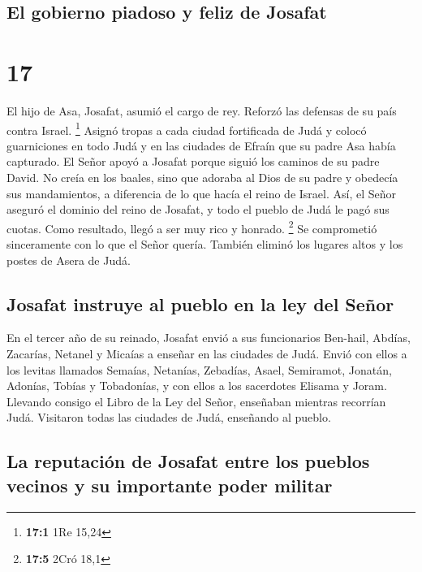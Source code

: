\hypertarget{el-gobierno-piadoso-y-feliz-de-josafat}{%
\subsection{El gobierno piadoso y feliz de
Josafat}\label{el-gobierno-piadoso-y-feliz-de-josafat}}

\hypertarget{section-16}{%
\section{17}\label{section-16}}

 El hijo de Asa, Josafat, asumió el cargo de rey. Reforzó
las defensas de su país contra Israel. \footnote{\textbf{17:1} 1Re 15,24}
 Asignó tropas a cada ciudad fortificada de Judá y colocó
guarniciones en todo Judá y en las ciudades de Efraín que su padre Asa
había capturado.  El Señor apoyó a Josafat porque siguió
los caminos de su padre David. No creía en los baales, 
sino que adoraba al Dios de su padre y obedecía sus mandamientos, a
diferencia de lo que hacía el reino de Israel.  Así, el
Señor aseguró el dominio del reino de Josafat, y todo el pueblo de Judá
le pagó sus cuotas. Como resultado, llegó a ser muy rico y honrado.
\footnote{\textbf{17:5} 2Cró 18,1}  Se comprometió
sinceramente con lo que el Señor quería. También eliminó los lugares
altos y los postes de Asera de Judá.

\hypertarget{josafat-instruye-al-pueblo-en-la-ley-del-seuxf1or}{%
\subsection{Josafat instruye al pueblo en la ley del
Señor}\label{josafat-instruye-al-pueblo-en-la-ley-del-seuxf1or}}

 En el tercer año de su reinado, Josafat envió a sus
funcionarios Ben-hail, Abdías, Zacarías, Netanel y Micaías a enseñar en
las ciudades de Judá.  Envió con ellos a los levitas
llamados Semaías, Netanías, Zebadías, Asael, Semiramot, Jonatán,
Adonías, Tobías y Tobadonías, y con ellos a los sacerdotes Elisama y
Joram.  Llevando consigo el Libro de la Ley del Señor,
enseñaban mientras recorrían Judá. Visitaron todas las ciudades de Judá,
enseñando al pueblo.

\hypertarget{la-reputaciuxf3n-de-josafat-entre-los-pueblos-vecinos-y-su-importante-poder-militar}{%
\subsection{La reputación de Josafat entre los pueblos vecinos y su
importante poder
militar}\label{la-reputaciuxf3n-de-josafat-entre-los-pueblos-vecinos-y-su-importante-poder-militar}}

